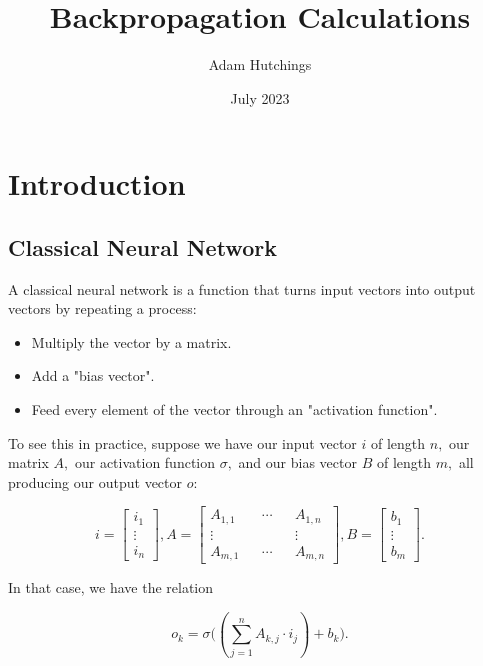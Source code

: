 \documentclass{article}
\title{Backpropagation Calculations}
\author{Adam Hutchings}
\date{July 2023}
\begin{document}
\maketitle

\section{Introduction}

\subsection{Classical Neural Network}

A classical neural network is a function that turns input vectors into output vectors by repeating a process:

\begin{itemize}

\item Multiply the vector by a matrix.

\item Add a "bias vector".

\item Feed every element of the vector through an "activation function".

\end{itemize}

To see this in practice, suppose we have our input vector $i$ of length $n,$ our matrix $A,$ our activation function $\sigma,$ and our bias vector $B$ of length $m,$ all producing our output vector $o:$

$$i = \begin{bmatrix} i_1 \\ \vdots \\ i_n \end{bmatrix}, A = \begin{bmatrix} A_{1,1} && \cdots && A_{1,n} \\ \vdots && && \vdots \\ A_{m,1} && \cdots && A_{m,n} \end{bmatrix}, B = \begin{bmatrix} b_1 \\ \vdots \\ b_m \end{bmatrix}.$$

In that case, we have the relation

\begin{equation}
\label{slayer}
o_k = \sigma \biggr ( (\sum_{j=1}^n A_{k,j} \cdot i_j ) + b_k \biggr ).
\end{equation}
\end{document}
